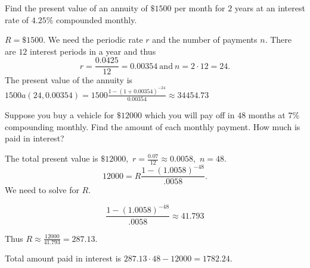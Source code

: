 \begin{example}
    Find the present value of an annuity of \(\$1500\) per month for \(2\) years at an interest rate of \(4.25\%\) compounded monthly.

    \begin{solution}
        \(R = \$1500.\) We need the periodic rate \(r\) and the number of payments \(n.\) There are \(12\) interest periods in a year and thus
        \[r = \frac{0.0425}{12} = 0.00354 \ \textrm{and} \ n = 2\cdot 12 = 24.\]
        The present value of the annuity is \(1500a\left(24,0.00354\right) = 1500\frac{1-\left(1+0.00354\right)^{-24}}{0.00354} \approx 34454.73\)
    \end{solution}
\end{example}

\begin{example}
    Suppose you buy a vehicle for \(\$12000\) which you will pay off in \(48\) months at \(7\%\) compounding monthly. Find the amount of each monthly payment. How much is paid in interest?

    \begin{solution}
        The total present value is \(\$12000,\) \(r = \frac{0.07}{12}\approx 0.0058,\) \(n=48.\)
        \[12000 = R\frac{1-\left(1.0058\right)^{-48}}{.0058}.\]
        We need to solve for \(R.\)

        \[\frac{1-\left(1.0058\right)^{-48}}{.0058} \approx 41.793\]

        Thus \(R \approx \frac{12000}{41.793} = 287.13.\)

        Total amount paid in interest is \(287.13\cdot 48 -12000 = 1782.24.\)
    \end{solution}
\end{example}